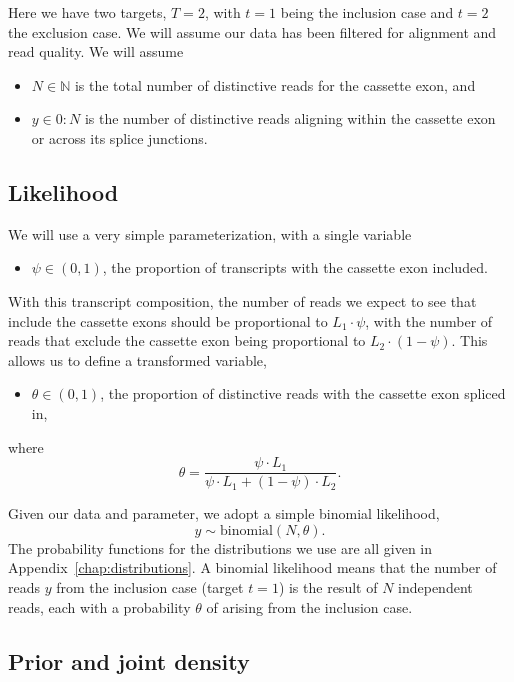 \documentclass[11pt]{report}
\begin{document}
Here we have two targets, $T = 2$, with $t = 1$ being the inclusion
case and $t = 2$ the exclusion case.  We will assume our data has been
filtered for alignment and read quality.  We will assume
%
\begin{itemize}
\item $N \in \mathbb{N}$ is the total number of distinctive reads for
  the cassette exon, and
\item $y \in 0{:}N$ is the number of distinctive reads aligning within
  the cassette exon or across its splice junctions.
\end{itemize}

\subsection{Likelihood}

We will use a very simple parameterization, with a single variable
%
\begin{itemize}
\item $\psi \in (0, 1)$, the proportion of transcripts with the
  cassette exon included.
\end{itemize}
%
With this transcript composition, the number of reads we expect to see
that include the cassette exons should be proportional to $L_1 \cdot
\psi$, with the number of reads that exclude the cassette exon being
proportional to $L_2 \cdot (1 - \psi)$.  This allows us to
define a transformed variable,
%
\begin{itemize}
\item $\theta \in (0, 1)$, the proportion of distinctive reads with
  the cassette exon spliced in,
\end{itemize}
%
where
\[
  \theta = \frac{\psi \cdot L_1}{\psi \cdot L_1 + (1 - \psi) \cdot L_2}.
\]
\vspace*{4pt}

Given our data and parameter, we adopt a simple binomial likelihood,
%
\[
  y \sim \textrm{binomial}(N, \theta).
\]
%
The probability functions for the distributions we use are all given
in Appendix~\ref{chap:distributions}.  A binomial likelihood means
that the number of reads $y$ from the inclusion case (target $t = 1$)
is the result of $N$ independent reads, each with a probability $\theta$
of arising from the inclusion case.

\subsection{Prior and joint density}
\end{document}
